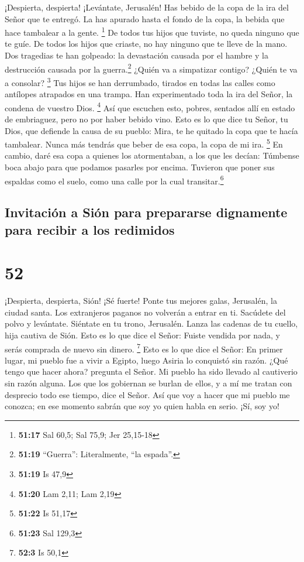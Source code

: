  ¡Despierta, despierta! ¡Levántate, Jerusalén! Has bebido
de la copa de la ira del Señor que te entregó. La has apurado hasta el
fondo de la copa, la bebida que hace tambalear a la gente. \footnote{\textbf{51:17}
  Sal 60,5; Sal 75,9; Jer 25,15-18}  De todos tus hijos
que tuviste, no queda ninguno que te guíe. De todos los hijos que
criaste, no hay ninguno que te lleve de la mano.  Dos
tragedias te han golpeado: la devastación causada por el hambre y la
destrucción causada por la guerra.\footnote{\textbf{51:19} ``Guerra'':
  Literalmente, ``la espada''.} ¿Quién va a simpatizar contigo? ¿Quién
te va a consolar? \footnote{\textbf{51:19} Is 47,9}  Tus
hijos se han derrumbado, tirados en todas las calles como antílopes
atrapados en una trampa. Han experimentado toda la ira del Señor, la
condena de vuestro Dios. \footnote{\textbf{51:20} Lam 2,11; Lam 2,19}
 Así que escuchen esto, pobres, sentados allí en estado
de embriaguez, pero no por haber bebido vino.  Esto es lo
que dice tu Señor, tu Dios, que defiende la causa de su pueblo: Mira, te
he quitado la copa que te hacía tambalear. Nunca más tendrás que beber
de esa copa, la copa de mi ira. \footnote{\textbf{51:22} Is 51,17}
 En cambio, daré esa copa a quienes los atormentaban, a
los que les decían: Túmbense boca abajo para que podamos pasarles por
encima. Tuvieron que poner sus espaldas como el suelo, como una calle
por la cual transitar.\footnote{\textbf{51:23} Sal 129,3}

\hypertarget{invitaciuxf3n-a-siuxf3n-para-prepararse-dignamente-para-recibir-a-los-redimidos}{%
\subsection{Invitación a Sión para prepararse dignamente para recibir a
los
redimidos}\label{invitaciuxf3n-a-siuxf3n-para-prepararse-dignamente-para-recibir-a-los-redimidos}}

\hypertarget{section-51}{%
\section{52}\label{section-51}}

 ¡Despierta, despierta, Sión! ¡Sé fuerte! Ponte tus
mejores galas, Jerusalén, la ciudad santa. Los extranjeros paganos no
volverán a entrar en ti.  Sacúdete del polvo y levántate.
Siéntate en tu trono, Jerusalén. Lanza las cadenas de tu cuello, hija
cautiva de Sión.  Esto es lo que dice el Señor: Fuiste
vendida por nada, y serás comprada de nuevo sin dinero. \footnote{\textbf{52:3}
  Is 50,1}  Esto es lo que dice el Señor: En primer lugar,
mi pueblo fue a vivir a Egipto, luego Asiria lo conquistó sin razón.
 ¿Qué tengo que hacer ahora? pregunta el Señor. Mi pueblo
ha sido llevado al cautiverio sin razón alguna. Los que los gobiernan se
burlan de ellos, y a mí me tratan con desprecio todo ese tiempo, dice el
Señor.  Así que voy a hacer que mi pueblo me conozca; en
ese momento sabrán que soy yo quien habla en serio. ¡Sí, soy yo!

